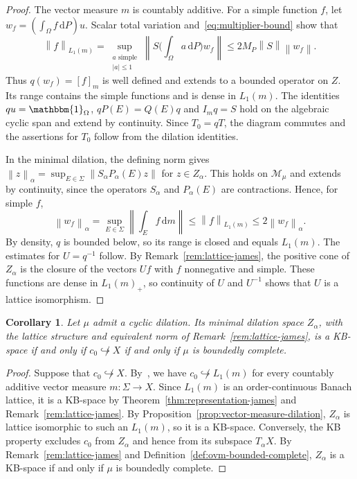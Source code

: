 \documentclass[11pt,leqno]{amsart}
\theoremstyle{compact}
\numberwithin{equation}{section}
\newtheorem{corollary}[theorem]{Corollary}
\theoremstyle{compactremark}
\theoremstyle{compact}
\newcommand{\1}{\mathbbm{1}}
\newcommand{\rmd}{\mathrm{d}}
\newcommand{\norm}[1]{\left\|#1\right\|}
\newcommand{\abs}[1]{\left|#1\right|}
\begin{document}
\begin{proof}
The vector measure $m$ is countably additive. For a simple function $f$, let $w_f=(\int_\Omega f\,\rmd P)u$. Scalar total variation and~\eqref{eq:multiplier-bound} show that
\[
\norm{f}_{L_1(m)}
=\sup_{\substack{a\text{ simple}\\\abs{a}\leq1}}\norm{S\Big(\int_\Omega a\,\rmd P\Big)w_f}
\leq2M_P\norm{S}\norm{w_f}.
\]
Thus $q(w_f)=[f]_m$ is well defined and extends to a bounded operator on $Z$. Its range contains the simple functions and is dense in $L_1(m)$. The identities $qu=\1_\Omega$, $qP(E)=Q(E)q$ and $I_mq=S$ hold on the algebraic cyclic span and extend by continuity. Since $T_0=qT$, the diagram commutes and the assertions for $T_0$ follow from the dilation identities.

In the minimal dilation, the defining norm gives $ \norm{z}_\alpha=\sup_{E\in\Sigma}\norm{S_\alpha P_\alpha(E)z}$ for $z\in Z_\alpha$. This holds on $\mathcal M_\mu$ and extends by continuity, since the operators $S_\alpha$ and $P_\alpha(E)$ are contractions. Hence, for simple $f$,
\[
\norm{w_f}_\alpha=\sup_{E\in\Sigma}\left\|\int_Ef\,\rmd m\right\|
\leq\norm{f}_{L_1(m)}\leq2\norm{w_f}_\alpha.
\]
By density, $q$ is bounded below, so its range is closed and equals $L_1(m)$. The estimates for $U=q^{-1}$ follow. By Remark~\ref{rem:lattice-james}, the positive cone of $Z_\alpha$ is the closure of the vectors $U f$ with $f$ nonnegative and simple. These functions are dense in $L_1(m)_+$, so continuity of $U$ and $U^{-1}$ shows that $U$ is a lattice isomorphism.
\end{proof}

\endgroup

\begingroup
\begin{corollary}\label{cor:review-minimal-kb}
Let $\mu$ admit a cyclic dilation. Its minimal dilation space $Z_\alpha$, with the lattice structure and equivalent norm of Remark~\ref{rem:lattice-james}, is a KB-space if and only if $c_0\not\hookrightarrow X$ if and only if $\mu$ is boundedly complete.
\end{corollary}

\begin{proof}
Suppose that $c_0\not\hookrightarrow X$. By~\cite[Corollary~4.4(iv)]{OkadaRickerSanchezPerez2014}, we have $c_0\not\hookrightarrow L_1(m)$ for every countably additive vector measure $m\colon\Sigma\to X$. Since $L_1(m)$ is an order-continuous Banach lattice, it is a KB-space by Theorem~\ref{thm:representation-james} and Remark~\ref{rem:lattice-james}. By Proposition~\ref{prop:vector-measure-dilation}, $Z_\alpha$ is lattice isomorphic to such an $L_1(m)$, so it is a KB-space. Conversely, the KB property excludes $c_0$ from $Z_\alpha$ and hence from its subspace $T_\alpha X$. By Remark~\ref{rem:lattice-james} and Definition~\ref{def:ovm-bounded-complete}, $Z_\alpha$ is a KB-space if and only if $\mu$ is boundedly complete.
\end{proof}
\endgroup
\end{document}
